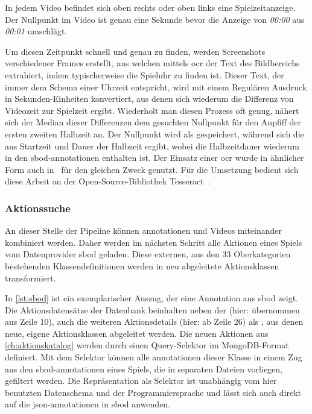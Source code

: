 In jedem Video befindet sich oben rechts oder oben links eine Spielzeitanzeige.
Der Nullpunkt im Video ist genau eine Sekunde bevor die Anzeige von \emph{00:00} aus \emph{00:01} umschlägt.

Um diesen Zeitpunkt schnell und genau zu finden, werden Screenshots verschiedener Frames erstellt, aus welchen mittels \gls{ocr} der Text des Bildbereichs extrahiert, indem typischerweise die Spieluhr zu finden ist.
Dieser Text, der immer dem Schema einer Uhrzeit entspricht, wird mit einem Regulären Ausdruck in Sekunden-Einheiten konvertiert, aus denen sich wiederum die Differenz von Videozeit zur Spielzeit ergibt.
Wiederholt man diesen Prozess oft genug, nähert sich der Median dieser Differenzen dem gesuchten Nullpunkt für den Anpfiff der ersten \bzw zweiten Halbzeit an.
Der Nullpunkt wird als  gespeichert, während sich die  aus Startzeit und Dauer der Halbzeit ergibt, wobei die Halbzeitdauer wiederum in den \gls{sbod}-\gls{annotationen} enthalten ist.
Der Einsatz einer \gls{ocr} wurde in ähnlicher Form auch in~\cite{Giancola18} für den gleichen Zweck genutzt.
Für die Umsetzung bedient sich diese Arbeit an der Open-Source-Bibliothek Tesseract~\cite{Smith07}.

\subsubsection{Aktionssuche}

An dieser Stelle der Pipeline können \gls{annotationen} und Videos miteinander kombiniert werden.
Daher werden im nächsten Schritt alle Aktionen eines Spiels vom Datenprovider \gls{sbod} geladen.
Diese externen, aus den 33 Oberkategorien bestehenden Klassendefinitionen werden in neu abgeleitete Aktionsklassen transformiert.

In \autoref{lst:sbod} ist ein exemplarischer Auszug, der eine Annotation aus \gls{sbod} zeigt.
Die Aktionsdatensätze der Datenbank beinhalten neben der  (hier: übernommen aus Zeile 10), auch die weiteren Aktionsdetails (hier: ab Zeile 26) als , aus denen neue, eigene Aktionsklassen abgeleitet werden.
Die neuen Aktionen aus \autoref{ch:aktionskatalog} werden durch einen Query-Selektor im MongoDB-Format\cite{Bradshaw16} definiert.
Mit dem Selektor können alle \gls{annotationen} dieser Klasse in einem Zug aus den \gls{sbod}-\gls{annotationen} eines Spiels, die in separaten Dateien vorliegen, gefiltert werden.
Die Repräsentation als Selektor ist unabhängig vom hier benutzten Datenschema und der Programmiersprache und lässt sich auch direkt auf die \gls{json}-\gls{annotationen} in \gls{sbod} anwenden.

